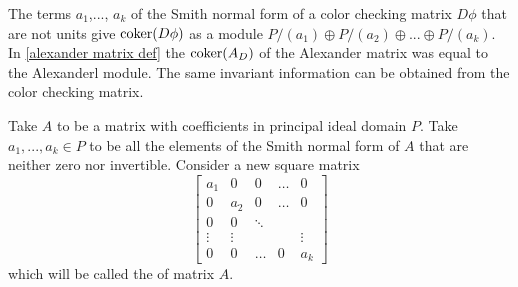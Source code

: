 %



The terms $a_1$,..., $a_k$ of the Smith normal form of a color checking matrix $D\phi$ that are not units give $\operatorname{coker}(D\phi)$ as a module $P/(a_1)\oplus P/(a_2)\oplus... \oplus P/(a_k)$. In \cref{alexander matrix def} the $\operatorname{coker}(A_D)$ of the Alexander matrix was equal to the Alexanderl module. The same invariant information can be obtained from the color checking matrix.

\begin{definition}\label{reduced normal form def}
  Take $A$ to be a matrix with coefficients in principal ideal domain $P$. Take $a_1,...,a_k\in P$ to be all the elements of the Smith normal form of $A$ that are neither zero nor invertible. Consider a new square matrix 
  $$
  \begin{bmatrix}
    a_1 & 0 & 0 & \hdots & 0\\ 
    0 & a_2 & 0 & \hdots & 0 \\ 
    0 & 0 & \ddots & &  \\ 
    \vdots & \vdots & & & \vdots \\ 
    0 & 0 & \hdots & 0 & a_k
  \end{bmatrix}
  $$
  which will be called the  of matrix $A$.
\end{definition}

